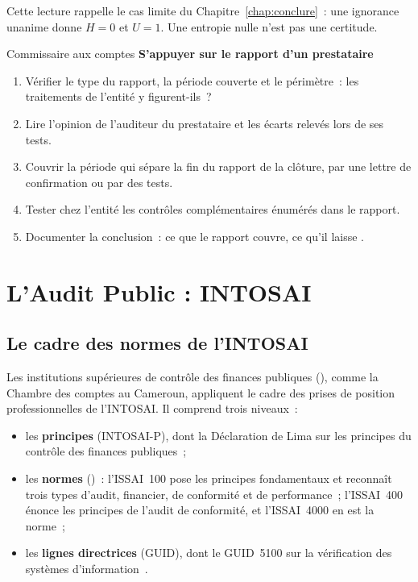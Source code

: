 Cette lecture rappelle le cas limite du Chapitre~\ref{chap:conclure}~:
une ignorance unanime donne $H = 0$ et $U = 1$. Une entropie nulle n'est
pas une certitude.

\begin{boxmetier}{Commissaire aux comptes}
\textbf{S'appuyer sur le rapport d'un prestataire}
\begin{enumerate}
    \item Vérifier le type du rapport, la période couverte et le périmètre~:
          les traitements de l'entité y figurent-ils~?
    \item Lire l'opinion de l'auditeur du prestataire et les écarts relevés
          lors de ses tests.
    \item Couvrir la période qui sépare la fin du rapport de la clôture,
          par une lettre de confirmation ou par des tests.
    \item Tester chez l'entité les contrôles complémentaires énumérés dans
          le rapport.
    \item Documenter la conclusion~: ce que le rapport couvre, ce qu'il
          laisse \NEK{}.
\end{enumerate}
\end{boxmetier}

\section{L'Audit Public : INTOSAI}
\label{sec:c10-public}

\subsection{Le cadre des normes de l'INTOSAI}

Les institutions supérieures de contrôle des finances publiques
(), comme la Chambre des comptes au Cameroun, appliquent le cadre
des prises de position professionnelles de l'INTOSAI. Il comprend trois
niveaux~:
\begin{itemize}
    \item les \textbf{principes} (INTOSAI-P), dont la Déclaration de Lima
          sur les principes du contrôle des finances publiques~;
    \item les \textbf{normes} ()~: l'ISSAI~100 pose les
          principes fondamentaux et reconnaît trois types d'audit, financier,
          de conformité et de performance~; l'ISSAI~400 énonce les principes
          de l'audit de conformité, et l'ISSAI~4000 en est la norme~;
    \item les \textbf{lignes directrices} (GUID), dont le GUID~5100 sur la
          vérification des systèmes d'information~\cite{intosai2019guid5100}.
\end{itemize}

